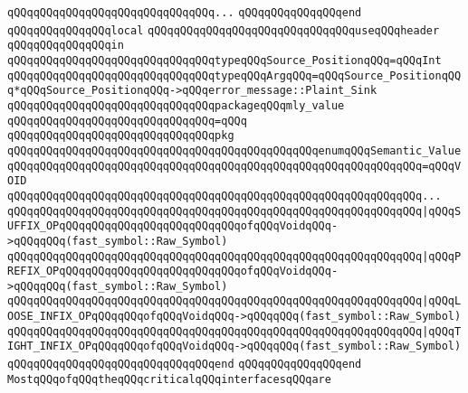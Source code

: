 \verb|qQQqqQQqqQQqqQQqqQQqqQQqqQQqqQQq...|\newline
\verb|qQQqqQQqqQQqqQQqend|\newline
\newline
\verb|qQQqqQQqqQQqqQQqlocal|\newline
\verb|qQQqqQQqqQQqqQQqqQQqqQQqqQQqqQQquseqQQqheader|\newline
\verb|qQQqqQQqqQQqqQQqin|\newline
\verb|qQQqqQQqqQQqqQQqqQQqqQQqqQQqqQQqtypeqQQqSource_PositionqQQq=qQQqInt|\newline
\verb|qQQqqQQqqQQqqQQqqQQqqQQqqQQqqQQqtypeqQQqArgqQQq=qQQqSource_PositionqQQq*qQQqSource_PositionqQQq->qQQqerror_message::Plaint_Sink|\newline
\verb|qQQqqQQqqQQqqQQqqQQqqQQqqQQqqQQqpackageqQQqmly_value|\newline
\verb|qQQqqQQqqQQqqQQqqQQqqQQqqQQqqQQq=qQQq|\newline
\verb|qQQqqQQqqQQqqQQqqQQqqQQqqQQqqQQqpkg|\newline
\verb|qQQqqQQqqQQqqQQqqQQqqQQqqQQqqQQqqQQqqQQqqQQqqQQqenumqQQqSemantic_Value|\newline
\verb|qQQqqQQqqQQqqQQqqQQqqQQqqQQqqQQqqQQqqQQqqQQqqQQqqQQqqQQqqQQqqQQq=qQQqVOID|\newline
\verb|qQQqqQQqqQQqqQQqqQQqqQQqqQQqqQQqqQQqqQQqqQQqqQQqqQQqqQQqqQQqqQQq...|\newline
\verb|qQQqqQQqqQQqqQQqqQQqqQQqqQQqqQQqqQQqqQQqqQQqqQQqqQQqqQQqqQQqqQQq|\verb#|qQQqSUFFIX_OPqQQqqQQqqQQqqQQqqQQqqQQqqQQqofqQQqVoidqQQq->qQQqqQQq(fast_symbol::Raw_Symbol)#\newline
\verb|qQQqqQQqqQQqqQQqqQQqqQQqqQQqqQQqqQQqqQQqqQQqqQQqqQQqqQQqqQQqqQQq|\verb#|qQQqPREFIX_OPqQQqqQQqqQQqqQQqqQQqqQQqqQQqofqQQqVoidqQQq->qQQqqQQq(fast_symbol::Raw_Symbol)#\newline
\verb|qQQqqQQqqQQqqQQqqQQqqQQqqQQqqQQqqQQqqQQqqQQqqQQqqQQqqQQqqQQqqQQq|\verb#|qQQqLOOSE_INFIX_OPqQQqqQQqofqQQqVoidqQQq->qQQqqQQq(fast_symbol::Raw_Symbol)#\newline
\verb|qQQqqQQqqQQqqQQqqQQqqQQqqQQqqQQqqQQqqQQqqQQqqQQqqQQqqQQqqQQqqQQq|\verb#|qQQqTIGHT_INFIX_OPqQQqqQQqofqQQqVoidqQQq->qQQqqQQq(fast_symbol::Raw_Symbol)#\newline
\verb|qQQqqQQqqQQqqQQqqQQqqQQqqQQqqQQqend|\newline
\verb|qQQqqQQqqQQqqQQqend|\newline
\newline
\verb|MostqQQqofqQQqtheqQQqcriticalqQQqinterfacesqQQqare|\newline
